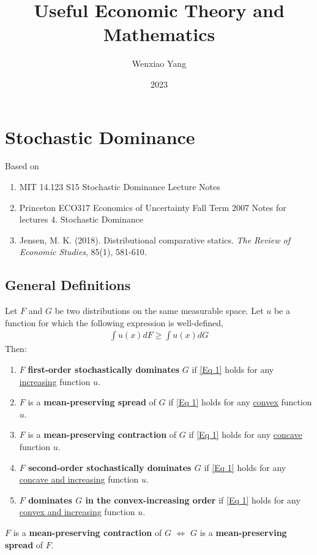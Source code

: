 \documentclass[11pt]{elegantbook}
\title{\textbf{Useful Economic Theory and Mathematics}}
\author{Wenxiao Yang}
\institute{Haas School of Business, University of California Berkeley}
\date{2023}
\begin{document}
\maketitle
\frontmatter
\tableofcontents
\mainmatter



\chapter{Stochastic Dominance}
Based on
\begin{enumerate}[$\circ$]
    \item MIT 14.123 S15 Stochastic Dominance Lecture Notes
    \item Princeton ECO317 Economics of Uncertainty Fall Term 2007 Notes for lectures 4. Stochastic Dominance
    \item Jensen, M. K. (2018). Distributional comparative statics. \textit{The Review of Economic Studies}, 85(1), 581-610.
\end{enumerate}

\section{General Definitions}
\begin{definition}\label{Defn SD}
    \normalfont
    Let $F$ and $G$ be two distributions on the same measurable space. Let $u$ be a function for which the following expression is well-defined,
    \begin{equation}
        \begin{aligned}
            \int u(x)dF\geq \int u(x)dG
        \end{aligned}
        \label{Eq 1}
    \end{equation}
    Then:
    \begin{enumerate}[$\bullet$]
        \item $F$ \textbf{first-order stochastically dominates} $G$ if \ref{Eq 1} holds for any \underline{increasing} function $u$.
        \item $F$ is a \textbf{mean-preserving spread} of $G$ if \ref{Eq 1} holds for any \underline{convex} function $u$.
        \item $F$ is a \textbf{mean-preserving contraction} of $G$ if \ref{Eq 1} holds for any \underline{concave} function $u$.
        \item \textbf{$F$ second-order stochastically dominates $G$} if \ref{Eq 1} holds for any \underline{concave and increasing} function $u$.
        \item \textbf{$F$ dominates $G$ in the convex-increasing order} if \ref{Eq 1} holds for any \underline{convex and increasing} function $u$.
    \end{enumerate}
\end{definition}
\begin{note}
    $F$ is a \textbf{mean-preserving contraction} of $G$ $\Leftrightarrow$ $G$ is a \textbf{mean-preserving spread} of $F$.
\end{note}
\end{document}
